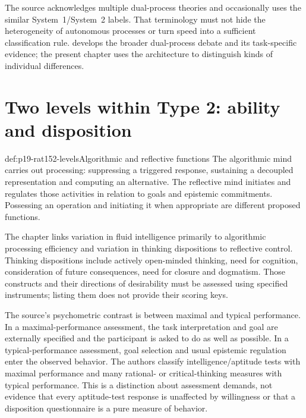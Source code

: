 The source acknowledges multiple dual-process theories and occasionally
uses the similar System~1/System~2 labels. That terminology must not hide
the heterogeneity of autonomous processes or turn speed into a sufficient
classification rule.  develops the broader
dual-process debate and its task-specific evidence; the present chapter
uses the architecture to distinguish kinds of individual differences.

\section{Two levels within Type 2: ability and disposition}
\label{sec:p19-rat152-tripartite}

\begin{hbdefinition}{def:p19-rat152-levels}{Algorithmic and reflective functions}
The algorithmic mind carries out processing: suppressing a triggered
response, sustaining a decoupled representation and computing an alternative.
The reflective mind initiates and regulates those activities in relation to
goals and epistemic commitments. Possessing an operation and initiating it
when appropriate are different proposed functions.

The chapter links variation in fluid intelligence primarily to algorithmic
processing efficiency and variation in thinking dispositions to reflective
control. Thinking dispositions include actively open-minded thinking,
need for cognition, consideration of future consequences, need for closure
and dogmatism. Those constructs and their directions of desirability must
be assessed using specified instruments; listing them does not provide
their scoring keys.
\end{hbdefinition}

The source's psychometric contrast is between maximal and typical
performance. In a maximal-performance assessment, the task interpretation
and goal are externally specified and the participant is asked to do as well
as possible. In a typical-performance assessment, goal selection and usual
epistemic regulation enter the observed behavior. The authors classify
intelligence/aptitude tests with maximal performance and many rational- or
critical-thinking measures with typical performance. This is a distinction
about assessment demands, not evidence that every aptitude-test response
is unaffected by willingness or that a disposition questionnaire is a
pure measure of behavior.

